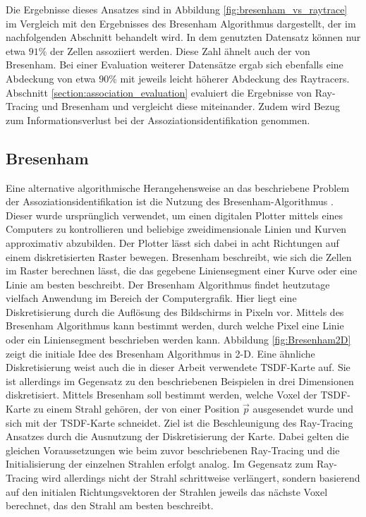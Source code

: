 Die Ergebnisse dieses Ansatzes sind in Abbildung \ref{fig:bresenham_vs_raytrace} im Vergleich mit den Ergebnisses des Bresenham Algorithmus dargestellt, der im nachfolgenden Abschnitt behandelt wird. In dem genutzten Datensatz können nur etwa $91\%$ der Zellen assoziiert werden. Diese Zahl ähnelt auch der von Bresenham. Bei einer Evaluation weiterer Datensätze ergab sich ebenfalls eine Abdeckung von etwa $90\%$ mit jeweils leicht höherer Abdeckung des Raytracers. Abschnitt \ref{section:association_evaluation} evaluiert die Ergebnisse von Ray-Tracing und Bresenham und vergleicht diese miteinander. Zudem wird Bezug zum Informationsverlust bei der Assoziationsidentifikation genommen.

\subsection{Bresenham}

Eine alternative algorithmische Herangehensweise an das beschriebene Problem der Assoziationsidentifikation ist die Nutzung des Bresenham-Algorithmus \cite{bresenham1965algorithm}. Dieser wurde ursprünglich verwendet, um einen digitalen Plotter mittels eines Computers zu kontrollieren und beliebige zweidimensionale Linien und Kurven approximativ abzubilden. Der Plotter lässt sich dabei in acht Richtungen auf einem diskretisierten Raster bewegen. Bresenham \cite{bresenham1965algorithm} beschreibt, wie sich die Zellen im Raster berechnen lässt, die das gegebene Liniensegment einer Kurve oder eine Linie am besten beschreibt. Der Bresenham Algorithmus findet heutzutage vielfach Anwendung im Bereich der Computergrafik. Hier liegt eine Diskretisierung durch die Auflösung des Bildschirms in Pixeln vor. Mittels des Bresenham Algorithmus kann bestimmt werden, durch welche Pixel eine Linie oder ein Liniensegment beschrieben werden kann. Abbildung \ref{fig:Bresenham2D} zeigt die initiale Idee des Bresenham Algorithmus in 2-D. Eine ähnliche Diskretisierung weist auch die in dieser Arbeit verwendete TSDF-Karte auf. Sie ist allerdings im Gegensatz zu den beschriebenen Beispielen in drei Dimensionen diskretisiert. Mittels Bresenham soll bestimmt werden, welche Voxel der TSDF-Karte zu einem Strahl gehören, der von einer Position $\vec{p}$ ausgesendet wurde und sich mit der TSDF-Karte schneidet. Ziel ist die Beschleunigung des Ray-Tracing Ansatzes durch die Ausnutzung der Diskretisierung der Karte. Dabei gelten die gleichen Voraussetzungen wie beim zuvor beschriebenen Ray-Tracing und die Initialisierung der einzelnen Strahlen erfolgt analog. Im Gegensatz zum Ray-Tracing wird allerdings nicht der Strahl schrittweise verlängert, sondern basierend auf den initialen Richtungsvektoren der Strahlen jeweils das nächste Voxel berechnet, das den Strahl am besten beschreibt.

